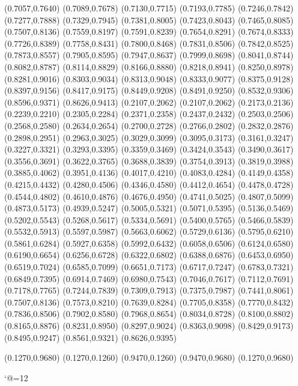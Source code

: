 \PST@Diamond(0.7057,0.7640)
\PST@Diamond(0.7089,0.7678)
\PST@Diamond(0.7130,0.7715)
\PST@Diamond(0.7193,0.7785)
\PST@Diamond(0.7246,0.7842)
\PST@Diamond(0.7277,0.7888)
\PST@Diamond(0.7329,0.7945)
\PST@Diamond(0.7381,0.8005)
\PST@Diamond(0.7423,0.8043)
\PST@Diamond(0.7465,0.8085)
\PST@Diamond(0.7507,0.8136)
\PST@Diamond(0.7559,0.8197)
\PST@Diamond(0.7591,0.8239)
\PST@Diamond(0.7654,0.8291)
\PST@Diamond(0.7674,0.8333)
\PST@Diamond(0.7726,0.8389)
\PST@Diamond(0.7758,0.8431)
\PST@Diamond(0.7800,0.8468)
\PST@Diamond(0.7831,0.8506)
\PST@Diamond(0.7842,0.8525)
\PST@Diamond(0.7873,0.8557)
\PST@Diamond(0.7905,0.8595)
\PST@Diamond(0.7947,0.8637)
\PST@Diamond(0.7999,0.8698)
\PST@Diamond(0.8041,0.8744)
\PST@Diamond(0.8082,0.8787)
\PST@Diamond(0.8114,0.8829)
\PST@Diamond(0.8166,0.8880)
\PST@Diamond(0.8218,0.8941)
\PST@Diamond(0.8250,0.8978)
\PST@Diamond(0.8281,0.9016)
\PST@Diamond(0.8303,0.9034)
\PST@Diamond(0.8313,0.9048)
\PST@Diamond(0.8333,0.9077)
\PST@Diamond(0.8375,0.9128)
\PST@Diamond(0.8397,0.9156)
\PST@Diamond(0.8417,0.9175)
\PST@Diamond(0.8449,0.9208)
\PST@Diamond(0.8491,0.9250)
\PST@Diamond(0.8532,0.9306)
\PST@Diamond(0.8596,0.9371)
\PST@Diamond(0.8626,0.9413)
\PST@Dashed(0.2107,0.2062)
(0.2107,0.2062)
(0.2173,0.2136)
(0.2239,0.2210)
(0.2305,0.2284)
(0.2371,0.2358)
(0.2437,0.2432)
(0.2503,0.2506)
(0.2568,0.2580)
(0.2634,0.2654)
(0.2700,0.2728)
(0.2766,0.2802)
(0.2832,0.2876)
(0.2898,0.2951)
(0.2963,0.3025)
(0.3029,0.3099)
(0.3095,0.3173)
(0.3161,0.3247)
(0.3227,0.3321)
(0.3293,0.3395)
(0.3359,0.3469)
(0.3424,0.3543)
(0.3490,0.3617)
(0.3556,0.3691)
(0.3622,0.3765)
(0.3688,0.3839)
(0.3754,0.3913)
(0.3819,0.3988)
(0.3885,0.4062)
(0.3951,0.4136)
(0.4017,0.4210)
(0.4083,0.4284)
(0.4149,0.4358)
(0.4215,0.4432)
(0.4280,0.4506)
(0.4346,0.4580)
(0.4412,0.4654)
(0.4478,0.4728)
(0.4544,0.4802)
(0.4610,0.4876)
(0.4676,0.4950)
(0.4741,0.5025)
(0.4807,0.5099)
(0.4873,0.5173)
(0.4939,0.5247)
(0.5005,0.5321)
(0.5071,0.5395)
(0.5136,0.5469)
(0.5202,0.5543)
(0.5268,0.5617)
(0.5334,0.5691)
(0.5400,0.5765)
(0.5466,0.5839)
(0.5532,0.5913)
(0.5597,0.5987)
(0.5663,0.6062)
(0.5729,0.6136)
(0.5795,0.6210)
(0.5861,0.6284)
(0.5927,0.6358)
(0.5992,0.6432)
(0.6058,0.6506)
(0.6124,0.6580)
(0.6190,0.6654)
(0.6256,0.6728)
(0.6322,0.6802)
(0.6388,0.6876)
(0.6453,0.6950)
(0.6519,0.7024)
(0.6585,0.7099)
(0.6651,0.7173)
(0.6717,0.7247)
(0.6783,0.7321)
(0.6849,0.7395)
(0.6914,0.7469)
(0.6980,0.7543)
(0.7046,0.7617)
(0.7112,0.7691)
(0.7178,0.7765)
(0.7244,0.7839)
(0.7309,0.7913)
(0.7375,0.7987)
(0.7441,0.8061)
(0.7507,0.8136)
(0.7573,0.8210)
(0.7639,0.8284)
(0.7705,0.8358)
(0.7770,0.8432)
(0.7836,0.8506)
(0.7902,0.8580)
(0.7968,0.8654)
(0.8034,0.8728)
(0.8100,0.8802)
(0.8165,0.8876)
(0.8231,0.8950)
(0.8297,0.9024)
(0.8363,0.9098)
(0.8429,0.9173)
(0.8495,0.9247)
(0.8561,0.9321)
(0.8626,0.9395)

\PST@Border(0.1270,0.9680)
(0.1270,0.1260)
(0.9470,0.1260)
(0.9470,0.9680)
(0.1270,0.9680)

\catcode`@=12
\fi
\endpspicture
